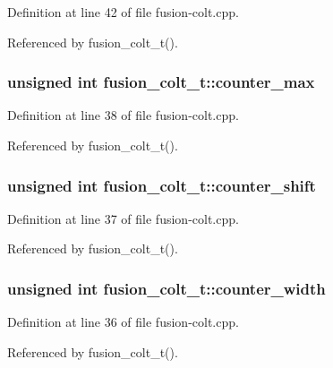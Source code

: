 Definition at line 42 of file fusion-colt.cpp.

Referenced by fusion\_\-colt\_\-t().
\subsubsection[{counter\_\-max}]{\setlength{\rightskip}{0pt plus 5cm}unsigned int {\bf fusion\_\-colt\_\-t::counter\_\-max}\hspace{0.3cm}{\tt  [protected]}}\label{classfusion__colt__t_1a5fe0b61c6257327cfac167f958e93a}




Definition at line 38 of file fusion-colt.cpp.

Referenced by fusion\_\-colt\_\-t().
\subsubsection[{counter\_\-shift}]{\setlength{\rightskip}{0pt plus 5cm}unsigned int {\bf fusion\_\-colt\_\-t::counter\_\-shift}\hspace{0.3cm}{\tt  [protected]}}\label{classfusion__colt__t_160c949fa8f6777e3647db02a24ac984}




Definition at line 37 of file fusion-colt.cpp.

Referenced by fusion\_\-colt\_\-t().
\subsubsection[{counter\_\-width}]{\setlength{\rightskip}{0pt plus 5cm}unsigned int {\bf fusion\_\-colt\_\-t::counter\_\-width}\hspace{0.3cm}{\tt  [protected]}}\label{classfusion__colt__t_d283c343edb68a46ad0c8a343c6c61bd}




Definition at line 36 of file fusion-colt.cpp.

Referenced by fusion\_\-colt\_\-t().
